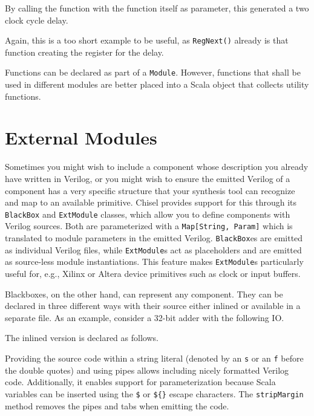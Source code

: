 \documentclass[%
    10pt,
    headinclude, footexclude,
    openright, %
    notitlepage,
    cleardoubleempty,
    headsepline,
    pointlessnumbers,
    bibtotoc, idxtotoc,
    ]{scrbook}
\newcommand{\code}[1]{{\small{\texttt{#1}}}}
\begin{document}

\noindent By calling the function with the function itself as parameter, this generated a two
clock cycle delay.


\noindent Again, this is a too short example to be useful, as \code{RegNext()}
already is that function creating the register for the delay.

Functions can be declared as part of a \code{Module}. However, functions that shall be
used in different modules are better placed into a Scala object that collects utility
functions.

\section{External Modules}

Sometimes you might wish to include a component whose description you already have 
written in Verilog, or you might wish to ensure the emitted Verilog of a component 
has a very specific structure that your synthesis tool can recognize and map to an 
available primitive. Chisel provides support for this through its \code{BlackBox} and 
\code{ExtModule} classes, which allow you to define components with Verilog sources. 
Both are parameterized with a \code{Map[String, Param]} which is translated to module 
parameters in the emitted Verilog. \code{BlackBox}es are emitted as individual Verilog 
files, while \code{ExtModule}s act as placeholders and are emitted as source-less module 
instantiations. This feature makes \code{ExtModule}s particularly useful for, e.g., 
Xilinx or Altera device primitives such as clock or input buffers.


\noindent Blackboxes, on the other hand, can represent any component. They can be 
declared in three different ways with their source either inlined or available in a 
separate file. As an example, consider a 32-bit adder with the following IO.

\noindent The inlined version is declared as follows. 

Providing the source code within a string literal (denoted by an \code{s} or an \code{f} 
before the double quotes) and using pipes allows including nicely formatted Verilog code. 
Additionally, it enables support for parameterization because Scala variables can be 
inserted using the \code{\$} or \code{\$\{\}} escape characters. The \code{stripMargin} 
method removes the pipes and tabs when emitting the code.
\end{document}
